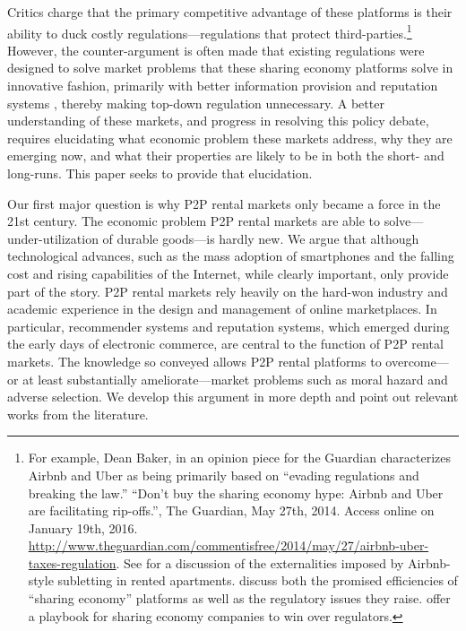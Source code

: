 \documentclass[11pt]{article}
\begin{document}
Critics charge that the primary competitive advantage of these platforms is their ability to duck costly regulations---regulations that protect third-parties.\footnote{
  For example, Dean Baker, in an opinion piece for the Guardian characterizes Airbnb and Uber as being primarily based on ``evading regulations and breaking the law.''
  ``Don't buy the sharing economy hype: Airbnb and Uber are facilitating rip-offs.'', The Guardian, May 27th, 2014. Access online on January 19th, 2016.
  \url{http://www.theguardian.com/commentisfree/2014/may/27/airbnb-uber-taxes-regulation}. 
  See \cite{horton2014tragedy} for a discussion of the externalities imposed by Airbnb-style subletting in rented apartments.
  \cite{edelman2015efficiencies} discuss both the promised efficiencies of ``sharing economy'' platforms as well as the regulatory issues they raise.
  \cite{cannon2014uber} offer a playbook for sharing economy companies to win over regulators.
}   
However, the counter-argument is often made that existing regulations were designed to solve market problems that these sharing economy platforms solve in innovative fashion, primarily with better information provision and reputation systems \citep{koopman2014sharing}, thereby making top-down regulation unnecessary.  
A better understanding of these markets, and progress in resolving this policy debate, requires elucidating what economic problem these markets address, why they are emerging now, and what their properties are likely to be in both the short- and long-runs. 
This paper seeks to provide that elucidation. 

Our first major question is why P2P rental markets only became a force in the 21st century. 
The economic problem P2P rental markets are able to solve---under-utilization of durable goods---is hardly new.  
We argue that although technological advances, such as the mass adoption of smartphones and the falling cost and rising capabilities of the Internet, while clearly important, only provide part of the story. 
P2P rental markets rely heavily on the hard-won industry and academic experience in the design and management of online marketplaces.
In particular, recommender systems and reputation systems, which emerged during the early days of electronic commerce, are central to the function of P2P rental markets. 
The knowledge so conveyed allows P2P rental platforms to overcome---or at least substantially ameliorate---market problems such as moral hazard and adverse selection.  
We develop this argument in more depth and point out relevant works from the literature. 
\end{document}
